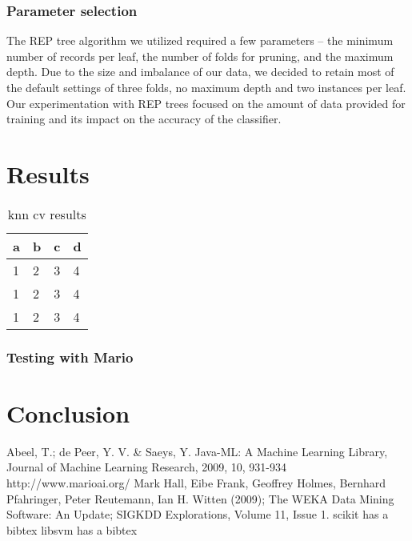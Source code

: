 \documentclass[]{article}   %
\begin{document}
\subsubsection{Parameter selection}
The REP tree algorithm we utilized required a few parameters -- the minimum number of records per leaf, the number of folds for pruning, and the maximum depth. Due to the size and imbalance of our data, we decided to retain most of the default settings of three folds, no maximum depth and two instances per leaf. Our experimentation with REP trees focused on the amount of data provided for training and its impact on the accuracy of the classifier.

\section{Results}

\begin{table}[h!]
	\begin{center}
		\caption{knn cv results}
		\begin{tabular}{l | l | l | l }
		a & b & c & d \\
		\hline
		1 & 2 & 3 & 4 \\
		1 & 2 & 3 & 4 \\
		1 & 2 & 3 & 4 \\
		\hline
		\end{tabular}
	\end{center}
\end{table}
\subsubsection{Testing with Mario}

\section{Conclusion}


\begin{thebibliography}{9}
  Abeel, T.; de Peer, Y. V. \& Saeys, Y. Java-ML: A Machine Learning Library, Journal of Machine Learning Research, 2009, 10, 931-934
  http://www.marioai.org/
  Mark Hall, Eibe Frank, Geoffrey Holmes, Bernhard Pfahringer, Peter Reutemann, Ian H. Witten (2009); The WEKA Data Mining Software: An Update; SIGKDD Explorations, Volume 11, Issue 1.
  scikit has a bibtex
  libsvm has a bibtex
\end{thebibliography}
\end{document}
